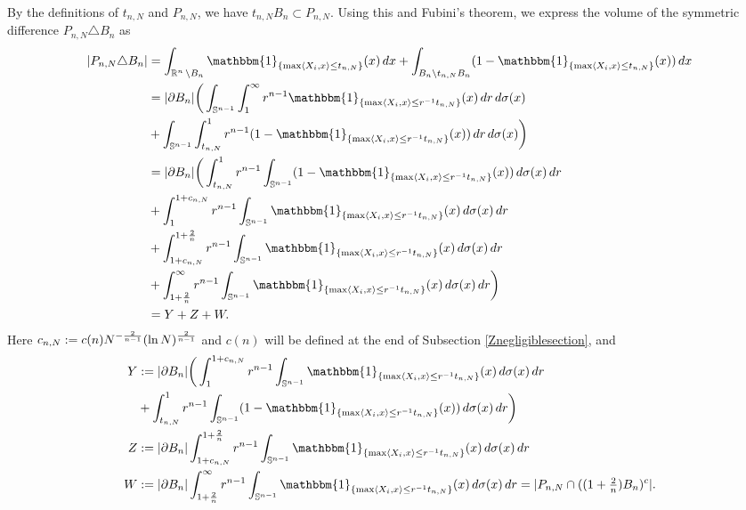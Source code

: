 By the definitions of $t_{n,N}$ and $P_{n,N}$, we have $t_{n,N}B_n\subset P_{n,N}$. Using this and Fubini's theorem, we express the volume of the symmetric difference $P_{n,N} \triangle B_n$ as
\begin{equation}\label{Eq:refine}
\begin{aligned}|P_{n,N}\triangle B_n| & =\int_{\R^{n}\setminus B_n}\mathbbm{1}_{\{\max\langle X_{i},x\rangle\leq t_{n,N}\}}(x)\,dx+\int_{B_n\setminus t_{n,N}B_n}(1-\mathbbm{1}_{\{\max\langle X_{i},x\rangle\leq t_{n,N}\}}(x))\,dx\\
& =|\partial B_n|\bigg(\int_{\mathbb{S}^{n-1}}\int_{1}^{\infty}r^{n-1}\mathbbm{1}_{\{\max\langle X_{i},x\rangle\leq r^{-1}t_{n,N}\}}(x)\,dr\,d\sigma(x)\\
& +\int_{\mathbb{S}^{n-1}}\int_{t_{n,N}}^{1}r^{n-1}(1-\mathbbm{1}_{\{\max\langle X_{i},x\rangle\leq r^{-1}t_{n,N}\}}(x))\,dr\,d\sigma(x)\bigg)\\
& =|\partial B_n|\bigg(\int_{t_{n,N}}^{1}r^{n-1}\int_{\Sp}(1-\mathbbm{1}_{\{\max\langle X_{i},x\rangle\leq r^{-1}t_{n,N}\}}(x))\,d\sigma(x)\,dr\\
& +\int_{1}^{1+c_{n,N}}r^{n-1}\int_{\mathbb{S}^{n-1}}\mathbbm{1}_{\{\max\langle X_{i},x\rangle\leq r^{-1}t_{n,N}\}}(x)\,d\sigma(x)\,dr\\
& +\int_{1+c_{n,N}}^{1+\frac{2}{n}}r^{n-1}\int_{\mathbb{S}^{n-1}}\mathbbm{1}_{\{\max\langle X_{i},x\rangle\leq r^{-1}t_{n,N}\}}(x)\,d\sigma(x)\,dr\\
& +\int_{1+\frac{2}{n}}^{\infty}r^{n-1}\int_{\mathbb{S}^{n-1}}\mathbbm{1}_{\{\max\langle X_{i},x\rangle\leq r^{-1}t_{n,N}\}}(x)\,d\sigma(x)\,dr\bigg)\\
& =Y+Z+W.
\end{aligned}
\end{equation}
Here $ c_{n,N}:=c(n)N^{-\frac 2{n-1}}(\ln N)^{\frac{2}{n-1}} $ and $c(n)$ will be defined at the end of Subsection \ref{Znegligiblesection}, and  
\begin{equation}\label{Eq:refine2}
\begin{aligned}Y & :=|\partial B_n|\bigg(\int_{1}^{1+c_{n,N}}r^{n-1}\int_{\mathbb{S}^{n-1}}\mathbbm{1}_{\{\max\langle X_{i},x\rangle\leq r^{-1}t_{n,N}\}}(x)\,d\sigma(x)\,dr\\
& +\int_{t_{n,N}}^{1}r^{n-1}\int_{\mathbb{S}^{n-1}}(1-\mathbbm{1}_{\{\max\langle X_{i},x\rangle\leq r^{-1}t_{n,N}\}}(x))\,d\sigma(x)\,dr\bigg) \\%
Z & :=|\partial B_n|\int_{1+c_{n,N}}^{1+\frac{2}{n}}r^{n-1}\int_{\mathbb{S}^{n-1}}\mathbbm{1}_{\{\max\langle X_{i},x\rangle\leq r^{-1}t_{n,N}\}}(x)\,d\sigma(x)\,dr\\
W & :=|\partial B_n|\int_{1+\frac{2}{n}}^{\infty}r^{n-1}\int_{\mathbb{S}^{n-1}}\mathbbm{1}_{\{\max\langle X_{i},x\rangle\leq r^{-1}t_{n,N}\}}(x)\,d\sigma(x)\,dr
=|P_{n,N}\cap((1+\tfrac{2}{n})B_n)^{c}|.
\end{aligned}
\end{equation}

